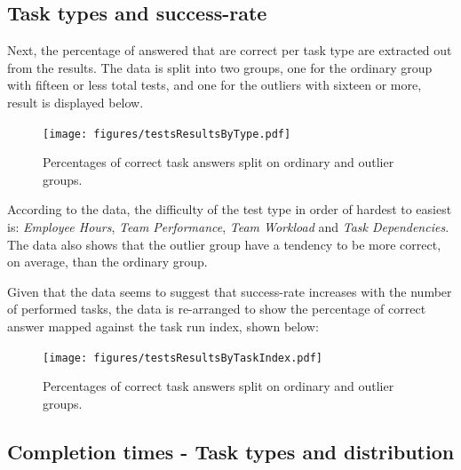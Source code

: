 \documentclass[nofilelist,dvipsnames]{cslthse-msc}
\begin{document}
      \subsection{Task types and success-rate}

        Next, the percentage of answered that are correct per task type are
        extracted out from the results. The data is split into two groups, one
        for the ordinary group with fifteen or less total tests, and one for
        the outliers with sixteen or more, result is displayed below.

				\begin{figure}[h!]
					\centering
          \texttt{[image: figures/testsResultsByType.pdf]}
          \caption{
            Percentages of correct task answers split on ordinary and outlier
            groups.
          }
				\end{figure}

        According to the data, the difficulty of the test type in order of
        hardest to easiest is: \textit{Employee Hours}, \textit{Team
          Performance}, \textit{Team Workload} and \textit{Task Dependencies}.
        The data also shows that the outlier group have a tendency to be more
        correct, on average, than the ordinary group.

        Given that the data seems to suggest that success-rate increases with
        the number of performed tasks, the data is re-arranged to show the
        percentage of correct answer mapped against the task run index, shown
        below:

				\begin{figure}[ht!]
					\centering
          \texttt{[image: figures/testsResultsByTaskIndex.pdf]}
          \caption{
            Percentages of correct task answers split on ordinary and outlier
            groups.
          }
				\end{figure}

%

      \subsection{Completion times - Task types and distribution}
\end{document}
